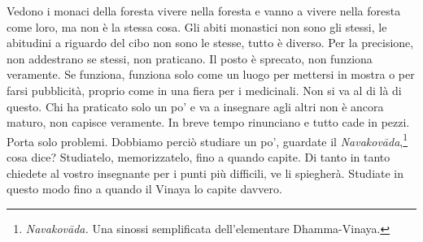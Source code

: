 Vedono i monaci della foresta vivere nella foresta e vanno a vivere
nella foresta come loro, ma non è la stessa cosa. Gli abiti monastici
non sono gli stessi, le abitudini a riguardo del cibo non sono le
stesse, tutto è diverso. Per la precisione, non addestrano se stessi,
non praticano. Il posto è sprecato, non funziona veramente. Se funziona,
funziona solo come un luogo per mettersi in mostra o per farsi
pubblicità, proprio come in una fiera per i medicinali. Non si va al di
là di questo. Chi ha praticato solo un po' e va a insegnare agli altri
non è ancora maturo, non capisce veramente. In breve tempo rinunciano e
tutto cade in pezzi. Porta solo problemi. Dobbiamo perciò studiare un
po', guardate il \emph{Navakovāda},\footnote{\emph{Navakovāda.} Una
  sinossi semplificata dell'elementare Dhamma-Vinaya.} cosa dice?
Studiatelo, memorizzatelo, fino a quando capite. Di tanto in tanto
chiedete al vostro insegnante per i punti più difficili, ve li
spiegherà. Studiate in questo modo fino a quando il Vinaya lo capite
davvero.

